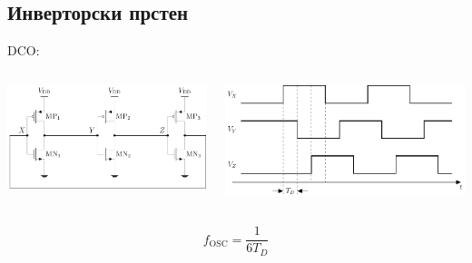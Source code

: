 \documentclass[aspectratio=169]{beamer}
\def \DCO  {DCO} %
\begin{document}
\subsection{Инверторски прстен}
\begin{frame}{\DCO: \subsecname}
    \begin{columns}[t]
        \begin{column}{0.5\linewidth}
        	\begin{center}
	            \includegraphics[scale=0.5]{slike/prezentacija/inv_ring_osc_1.pdf} 
	        \end{center}
        \end{column}
        \begin{column}{0.5\linewidth}
        	\begin{center}
            	\includegraphics[scale=0.5]{slike/prezentacija/inv_ring_osc_2.pdf}
            \end{center}
        \end{column}
    \end{columns}
    \bigskip
    \vspace{0.5cm}
    \small
    \begin{equation}
        f_\text{OSC} = \frac{1}{6T_D} \nonumber
    \end{equation}
\end{frame}
\end{document}
